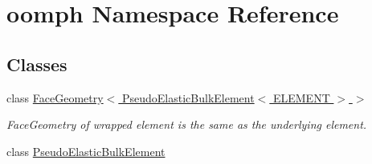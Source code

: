 \hypertarget{namespaceoomph}{}\section{oomph Namespace Reference}
\label{namespaceoomph}
\subsection*{Classes}
\begin{DoxyCompactItemize}
\item 
class \hyperlink{classoomph_1_1FaceGeometry_3_01PseudoElasticBulkElement_3_01ELEMENT_01_4_01_4}{Face\+Geometry$<$ Pseudo\+Elastic\+Bulk\+Element$<$ E\+L\+E\+M\+E\+N\+T $>$ $>$}
\begin{DoxyCompactList}\small\item\em Face\+Geometry of wrapped element is the same as the underlying element. \end{DoxyCompactList}\item 
class \hyperlink{classoomph_1_1PseudoElasticBulkElement}{Pseudo\+Elastic\+Bulk\+Element}
\end{DoxyCompactItemize}
